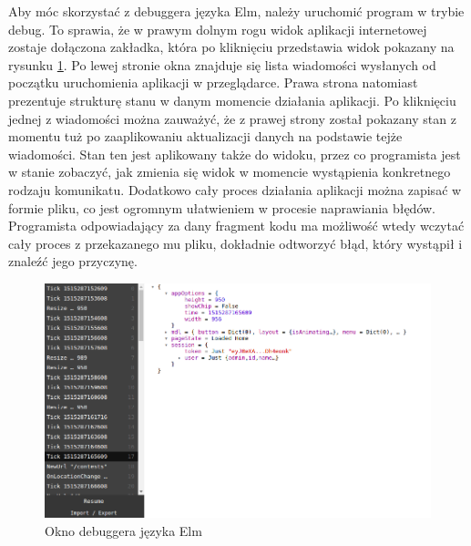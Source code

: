Aby móc skorzystać z debuggera języka Elm, należy uruchomić program w trybie debug. To sprawia, że w prawym dolnym rogu widok aplikacji internetowej zostaje dołączona zakładka, która po kliknięciu przedstawia widok pokazany na rysunku \ref{fig:elmDebugger}. Po lewej stronie okna znajduje się lista wiadomości wysłanych od początku uruchomienia aplikacji w przeglądarce. Prawa strona natomiast prezentuje strukturę stanu w danym momencie działania aplikacji. Po kliknięciu jednej z wiadomości można zauważyć, że z prawej strony został pokazany stan z momentu tuż po zaaplikowaniu aktualizacji danych na podstawie tejże wiadomości. Stan ten jest aplikowany także do widoku, przez co programista jest w stanie zobaczyć, jak zmienia się widok w momencie wystąpienia konkretnego rodzaju komunikatu. Dodatkowo cały proces działania aplikacji można zapisać w formie pliku, co jest ogromnym ułatwieniem w procesie naprawiania błędów. Programista odpowiadający za dany fragment kodu ma możliwość wtedy wczytać cały proces z przekazanego mu pliku, dokładnie odtworzyć błąd, który wystąpił i znaleźć jego przyczynę.
\begin{figure}[h]
	\centering
	\includegraphics[width=\textwidth]{images/elm_debugger}
	\caption{Okno debuggera języka Elm}
	\label{fig:elmDebugger}
\end{figure}

